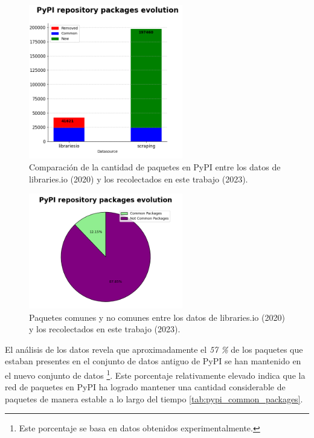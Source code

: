 \begin{figure}[ht!]
    \begin{center}
        \includegraphics[width=0.6\textwidth]{img/pypi/bar_common_packages.png}
        \caption{Comparación de la cantidad de paquetes en PyPI entre los datos de libraries.io (2020) y los recolectados en este trabajo (2023).}
        \label{fig:pipy_common_packages_bar}
    \end{center}
\end{figure}

\begin{figure}[ht!]
    \begin{center}
        \includegraphics[width=0.6\textwidth]{img/pypi/circ_common_packages.png}
        \caption{Paquetes comunes y no comunes entre los datos de libraries.io (2020) y los recolectados en este trabajo (2023).}
        \label{fig:pipy_common_packages_circle}
    \end{center}
\end{figure}

El análisis de los datos revela que aproximadamente el \textit{57 \%} de los paquetes que estaban
presentes en el conjunto de datos antiguo de PyPI se han mantenido en el nuevo conjunto de datos
\footnote{Este porcentaje se basa en datos obtenidos experimentalmente.}. Este porcentaje
relativamente elevado indica que la red de paquetes en PyPI ha logrado mantener una cantidad considerable
de paquetes de manera estable a lo largo del tiempo \ref{tab:pypi_common_packages}.


